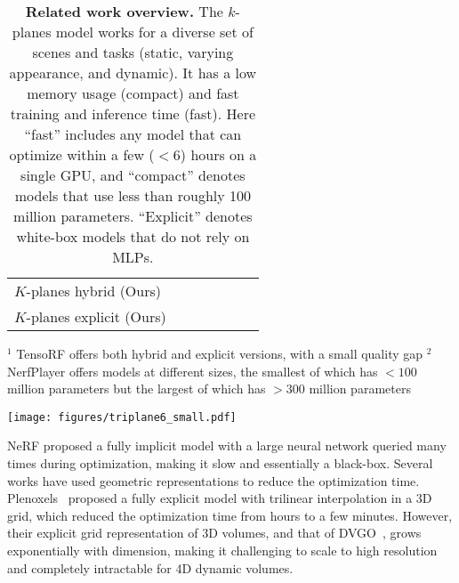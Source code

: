 \documentclass[10pt,twocolumn,letterpaper]{article}
\makeatletter
\newcommand{\cmark}{\ding{51}}\newcommand{\xmark}{\ding{55}}
\newcommand{\modelname}{$k$-planes}
\newcommand{\Modelname}{$K$-planes}
\newcommand{\greencheck}{{\color{green}\cmark}}
\newcommand{\redcross}{{\color{red}\xmark}}
\renewcommand{\paragraph}{\@startsection{paragraph}{4}{\z@}{0.65ex \@plus 1ex \@minus .2ex}{-1em}{\normalfont \normalsize \bfseries }}
\makeatother
\begin{document}
\begin{table}[ht!]
{\begin{tabular}{l|cccccc}
         \Modelname{} hybrid (Ours) & \greencheck  &  \greencheck &  \greencheck  &  \greencheck  & \greencheck & \redcross \\ 
         \Modelname{} explicit (Ours) & \greencheck  &  \greencheck &  \greencheck  &  \greencheck  & \greencheck & \greencheck \\ \bottomrule
    \end{tabular}}
    \vspace{-0.1cm}
    \begin{flushleft}
    {\footnotesize $^1$ TensoRF offers both hybrid and explicit versions, with a small quality gap}
    {\footnotesize $^2$ NerfPlayer offers models at different sizes, the smallest of which has $<100$ million parameters but the largest of which has $>300$ million parameters}
    \end{flushleft}
    \caption{\textbf{Related work overview.} The \modelname{} model works for a diverse set of scenes and tasks (static, varying appearance, and dynamic). It has a low memory usage (compact) and fast training and inference time (fast). Here ``fast'' includes any model that can optimize within a few ($<6$) hours on a single GPU, and ``compact'' denotes models that use less than roughly 100 million parameters. ``Explicit'' denotes white-box models that do not rely on MLPs.}
    \label{tab:relatedwork}
\end{table}



\begin{figure*}
    \centering
    \texttt{[image: figures/triplane6\_small.pdf]}
    \caption{\textbf{Method overview.} (a) Our \modelname{} representation factorizes 4D dynamic volumes into six planes, three for space and three for spatiotemporal variations. To obtain the value of a 4D point $\textbf{q}=(x,y,z,t)$, we first project the point into each plane, in which we (b) do multiscale bilinear interpolation. (c) The interpolated values are multiplied and then concatenated over the $S$ scales. (d) These features are decoded either with a small MLP or our explicit linear decoder. (e) We follow the standard volumetric rendering formula to predict ray color and density. The model is optimized by (f) minimizing the reconstruction loss with simple regularization in space and time.}
    \label{fig:overview}
\end{figure*}

\paragraph{Spatial decomposition.}
NeRF\cite{nerf} proposed a fully implicit model with a large neural network queried many times during optimization, making it slow and essentially a black-box. 
Several works have used geometric representations to reduce the optimization time. Plenoxels~\cite{plenoxels} proposed a fully explicit model with trilinear interpolation in a 3D grid, which reduced the optimization time from hours to a few minutes. 
However, their explicit grid representation of 3D volumes, and that of DVGO~\cite{dvgo}, grows exponentially with dimension, making it challenging to scale to high resolution and completely intractable for 4D dynamic volumes. 
\end{document}
